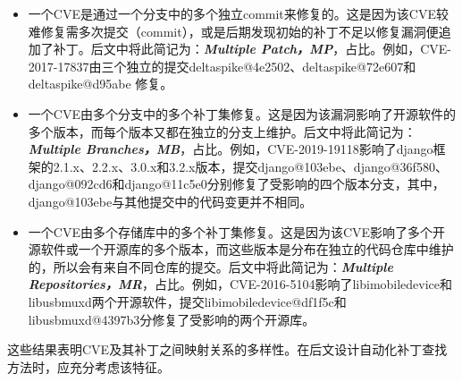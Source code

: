 \begin{itemize}[leftmargin=*]
\item 一个CVE是通过一个分支中的多个独立commit来修复的。这是因为该CVE较难修复需多次提交（commit），或是后期发现初始的补丁不足以修复漏洞便追加了补丁。后文中将此简记为：\textbf{\textit{Multiple Patch，MP}}，占比。例如，CVE-2017-17837由三个独立的提交deltaspike@4e2502\cite{deltaspike-1}、deltaspike@72e607\cite{deltaspike-2}和deltaspike@d95abe\cite{deltaspike-3} 修复。
\item 一个CVE由多个分支中的多个补丁集修复。这是因为该漏洞影响了开源软件的多个版本，而每个版本又都在独立的分支上维护。后文中将此简记为：\textbf{\textit{Multiple Branches，MB}}，占比。例如，CVE-2019-19118影响了django框架的2.1.x、2.2.x、3.0.x和3.2.x版本，提交django@103ebe\cite{django-1}、django@36f580\cite{django-2}、django@092cd6\cite{django-3}和django@11c5e0\cite{django-4}分别修复了受影响的四个版本分支，其中，django@103ebe与其他提交中的代码变更并不相同。
\item 一个CVE由多个存储库中的多个补丁集修复。这是因为该CVE影响了多个开源软件或一个开源库的多个版本，而这些版本是分布在独立的代码仓库中维护的，所以会有来自不同仓库的提交。后文中将此简记为：\textbf{\textit{Multiple Repositories，MR}}，占比。例如，CVE-2016-5104影响了libimobiledevice和libusbmuxd两个开源软件，提交libimobiledevice@df1f5c\cite{libimobiledevice}和libusbmuxd@4397b3\cite{libusbmuxd}分修复了受影响的两个开源库。

\end{itemize}

这些结果表明CVE及其补丁之间映射关系的多样性。在后文设计自动化补丁查找方法时，应充分考虑该特征。

